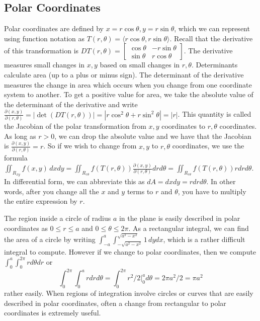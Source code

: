 \subsection{Polar Coordinates}
Polar coordinates are defined by $x=r\cos\theta, y=r\sin\theta$, which we can
represent using function notation as $T(r,\theta)=\langle r\cos\theta,
r\sin\theta\rangle$. Recall that the derivative of this transformation is 
$DT(r,\theta)= 
\begin{bmatrix}
\cos\theta&-r\sin\theta\\
\sin\theta&r\cos\theta
\end{bmatrix}$. 
The derivative measures small changes in $x,y$ based on small changes
in $r,\theta$.  Determinants calculate area (up to a plus or minus sign).
The determinant of the derivative measures the change in area which
occurs when you change from one coordinate system to another.  To get
a positive value for area, we take the absolute value of the
determinant of the derivative and write $\frac{\partial(x,y)}{\partial(r,\theta)} =
|\det(DT(r,\theta))| = |r\cos^2\theta+r\sin^2\theta| = |r|$. This quantity is called
the Jacobian of the polar transformation from $x,y$ coordinates to $r,\theta$
coordinates.  As long as $r>0$, we can drop the absolute value and we
have that the Jacobian is $\frac{\partial(x,y)}{\partial(r,\theta)}=r$.  So if we wish to
change from $x,y$ to $r,\theta$ coordinates, we use the formula
$\iint_{R_{xy}} f(x,y)\,dxdy = \iint_{R_{r\theta}}
f(T(r,\theta))\frac{\partial(x,y)}{\partial(r,\theta)}drd\theta =  \iint_{R_{r\theta}} f(T(r,\theta))rdrd\theta $.
In differential form, we can abbreviate this as $dA=dxdy = rdrd\theta$. In
other words, after you change all the $x$ and $y$ terms to $r$ and
$\theta$, you have to multiply the entire expression by $r$.

\begin{example}
The region inside a circle of radius $a$ in the plane is easily
described in polar coordinates as $0\leq r\leq a$ and $0\leq \theta\leq 2\pi$. As a
rectangular integral, we can find the area of a circle by writing
$\int_{-a}^a\int_{-\sqrt{a^2-x^2}}^{\sqrt{a^2-x^2}}1\,dydx$, which is a rather
difficult integral to compute. However if we change to polar
coordinates, then we compute $\int_0^a\int_0^{2\pi}rd\theta dr$ or
$$\int_0^{2\pi}\int_0^ardrd\theta  = \int_0^{2\pi}r^2/2\big|_0^ad\theta  = 2\pi a^2/2 = \pi a^2 $$
rather easily. When regions of integration involve circles or curves
that are easily described in polar coordinates, often a change from
rectangular to polar coordinates is extremely useful. 
\end{example}

